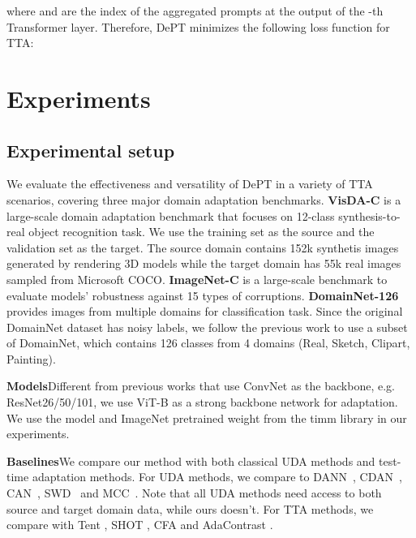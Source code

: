 \documentclass{article} \usepackage{iclr2023_conference,times}
\begin{document}
where  and  are the index of the aggregated prompts at the output of the -th Transformer layer. Therefore, DePT minimizes the following loss function for TTA:







\section{Experiments}


\subsection{Experimental setup}
We evaluate the effectiveness and versatility of DePT in a variety of TTA scenarios, covering three major domain adaptation benchmarks. \textbf{VisDA-C} \citep{visda2017} is a large-scale domain adaptation benchmark that focuses on 12-class synthesis-to-real object recognition task. We use the training set as the source and the validation set as the target. The source domain contains 152k synthetis images generated by rendering 3D models while the target domain has 55k real images sampled from Microsoft COCO. \textbf{ImageNet-C} \citep{hendrycks2019benchmarking} is a large-scale benchmark to evaluate models' robustness against 15 types of corruptions. \textbf{DomainNet-126} \citep{peng2019moment} provides images from multiple domains for classification task. Since the original DomainNet dataset has noisy labels, we follow the previous work \citep{saito2019semi,chen2022contrastive} to use a subset of DomainNet, which contains 126 classes from 4 domains (Real, Sketch, Clipart, Painting).

\textbf{Models}\quad Different from previous works that use ConvNet as the backbone, e.g. ResNet26/50/101, we use ViT-B as a strong backbone network for adaptation. We use the model and ImageNet pretrained weight from the timm library \citep{rw2019timm} in our experiments.

\textbf{Baselines}\quad We compare our method with both classical UDA methods and test-time adaptation methods. For UDA methods, we compare to DANN~\citep{ganin2015unsupervised}, CDAN~\citep{long2018conditional}, CAN~\citep{kang2019contrastive}, SWD~\citep{lee2019sliced} and MCC~\citep{jin2020minimum}. Note that all UDA methods need access to both source and target domain data, while ours doesn't. For TTA methods, we compare with Tent \citep{wang2020tent}, SHOT \citep{liang2020we}, CFA \citep{kojima2022robustifying} and AdaContrast \citep{chen2022contrastive}.
\end{document}
